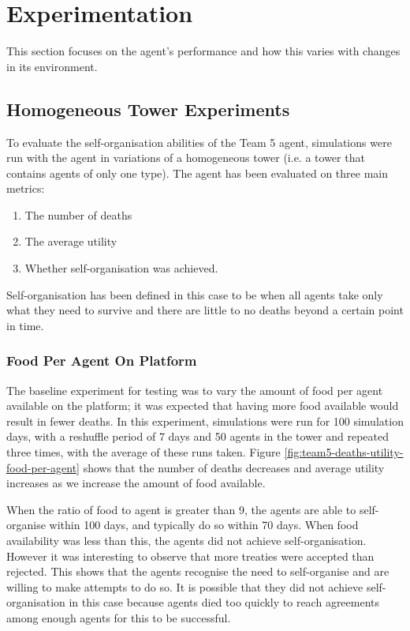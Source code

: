 \section{Experimentation}\label{sec:team5-experimentation}
This section focuses on the agent's performance and how this varies with changes in its environment.

\subsection*{Homogeneous Tower Experiments}
To evaluate the self-organisation abilities of the Team 5 agent, simulations were run with the agent in variations of a homogeneous tower (i.e. a tower that contains agents of only one type). The agent has been evaluated on three main metrics:
\begin{enumerate}
    \item The number of deaths
    \item The average utility
    \item Whether self-organisation was achieved.
\end{enumerate}
Self-organisation has been defined in this case to be when all agents take only what they need to survive and there are little to no deaths beyond a certain point in time.

\subsubsection*{Food Per Agent On Platform}
The baseline experiment for testing was to vary the amount of food per agent available on the platform; it was expected that having more food available would result in fewer deaths. In this experiment, simulations were run for 100 simulation days, with a reshuffle period of 7 days and 50 agents in the tower and repeated three times, with the average of these runs taken. Figure \ref{fig:team5-deaths-utility-food-per-agent} shows that the number of deaths decreases and average utility increases as we increase the amount of food available.

When the ratio of food to agent is greater than 9, the agents are able to self-organise within 100 days, and typically do so within 70 days. When food availability was less than this, the agents did not achieve self-organisation. However it was interesting to observe that more treaties were accepted than rejected. This shows that the agents recognise the need to self-organise and are willing to make attempts to do so. It is possible that they did not achieve self-organisation in this case because agents died too quickly to reach agreements among enough agents for this to be successful.

